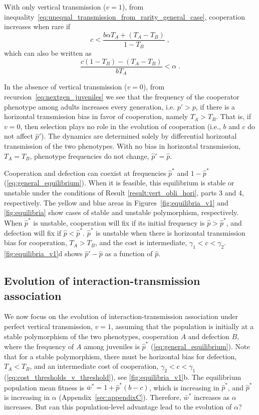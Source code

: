 \documentclass[12pt]{extarticle}
\begin{document}
With only vertical transmission ($v=1$), from inequality~\ref{eq:unequal_transmission_from_rarity_general_case}, cooperation increases when rare if
\begin{equation} \label{eq:vert_hori}
c < \frac{b \alpha T_A + (T_A - T_B)}{1-T_B} \;,
\end{equation} 
which can also be written as
\begin{equation} \label{eq:vert_hori_alpha}
\frac{c (1-T_B)-(T_A-T_B)}{b T_A} < \alpha \;.
\end{equation}

In the absence of vertical transmission ($v=0$), from recursion~\ref{eq:nextgen_juveniles} we see that the frequency of the cooperator phenotype among adults increases every generation, i.e. $p'>p$, if there is a horizontal transmission bias in favor of cooperation, namely $T_A > T_B$.  
That is, if $v=0$, then selection plays no role in the evolution of cooperation (i.e., $b$ and $c$ do not affect $\hat p'$).
The dynamics are determined solely by differential horizontal transmission of the two phenotypes.
With no bias in horizontal transmission, $T_A = T_B$, phenotype frequencies do not change, $\hat p'=\hat p$.

Cooperation and defection can coexist at frequencies $\hat{p}^*$ and $1-\hat{p}^*$ (\autoref{eq:general_equilibrium}). 
When it is feasible, this equilibrium is stable or unstable under the conditions of Result \ref{result:vert_obli_hori}, parts 3 and 4, respectively. The yellow and blue areas in Figures~\ref{fig:equilibria_v1} and \ref{fig:equilibria} show cases of stable and unstable polymorphism, respectively.
When $\hat{p}^*$ is unstable, cooperation will fix if its initial frequency is $\hat{p}>\hat{p}^*$, and defection will fix if $\hat{p}<\hat{p}^*$.
$\hat{p}^*$ is unstable when there is horizontal transmission bias for cooperation, $T_A>T_B$, and the cost is intermediate, $\gamma_1 < c < \gamma_2$.
\autoref{fig:equilibria_v1}d shows $\hat{p}'-\hat{p}$ as a function of $\hat{p}$.


\subsection*{Evolution of interaction-transmission association} 

We now focus on the evolution of interaction-transmission association under perfect vertical transmission, $v=1$, assuming that the population is initially at a stable polymorphism of the two phenotypes, cooperation $A$ and defection $B$, where the frequency of $A$ among juveniles is $\hat{p}^*$ (\autoref{eq:general_equilibrium}).
Note that for a stable polymorphism, there must be horizontal bias for defection, $T_A < T_B$, and an intermediate cost of cooperation, $\gamma_2 < c < \gamma_1$ (\autoref{eq:cost_thresholds_v_threshold}), see \autoref{fig:equilibria_v1}b.
The equilibrium population mean fitness is $\bar{w}^* = 1 + \hat{p}^*(b-c)$, which is increasing in $\hat{p}^*$, and $\hat{p}^*$ is increasing in $\alpha$ (Appendix~\ref{sec:appendixC}).
Therefore, $\bar{w}^*$ increases as $\alpha$ increases.
But can this population-level advantage lead to the evolution of $\alpha$? 
\end{document}
